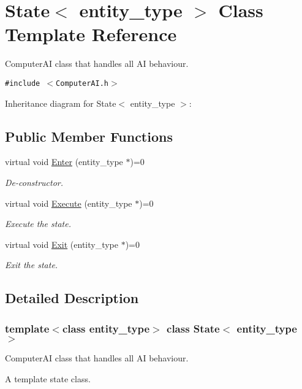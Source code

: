\hypertarget{class_state}{
\section{State$<$ entity\_\-type $>$ Class Template Reference}
\label{class_state}
}
ComputerAI class that handles all AI behaviour.  


{\tt \#include $<$ComputerAI.h$>$}

Inheritance diagram for State$<$ entity\_\-type $>$:\subsection*{Public Member Functions}
\begin{CompactItemize}
\item 
virtual void \hyperlink{class_state_88e14ab108f9e28a53630c4557b9743d}{Enter} (entity\_\-type $\ast$)=0
\begin{CompactList}\small\item\em De-constructor. \item\end{CompactList}\item 
virtual void \hyperlink{class_state_f12fe8dcc213356992ae0ad9f8d315ff}{Execute} (entity\_\-type $\ast$)=0
\begin{CompactList}\small\item\em Execute the state. \item\end{CompactList}\item 
virtual void \hyperlink{class_state_1dc07d3a42d904b7e954fcfa3d27f23f}{Exit} (entity\_\-type $\ast$)=0
\begin{CompactList}\small\item\em Exit the state. \item\end{CompactList}\end{CompactItemize}


\subsection{Detailed Description}
\subsubsection*{template$<$class entity\_\-type$>$ class State$<$ entity\_\-type $>$}

ComputerAI class that handles all AI behaviour. 

A template state class.

